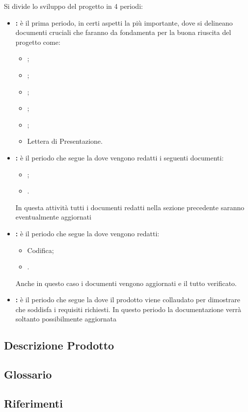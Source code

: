 \documentclass[12pt,a4paper]{article}
\begin{document}
Si divide lo sviluppo del progetto in 4 periodi:
\begin{itemize}
	\item \textbf{\FA{}:} è il prima periodo, in certi aspetti la più importante, dove si delineano documenti cruciali che faranno da fondamenta per la buona riuscita del progetto come:
	\begin{itemize}
		\item \NdP{};
		\item \SdF{};
		\item \AdR{};
		\item \PdP{};
		\item \PdQ{};
		\item Lettera di Presentazione.
	\end{itemize}
	\item \textbf{\FPA{}:} è il periodo che segue la \RR{} dove vengono redatti i seguenti documenti:
	\begin{itemize}
		\item \ST{};
        \item \DP{}.
	\end{itemize} 
	In questa attività tutti i documenti redatti nella sezione precedente saranno eventualmente aggiornati
	\item \textbf{\FPDC{}:} è il periodo che segue la \RP{} dove vengono redatti:
	\begin{itemize}
		\item Codifica;
		\item \MU{}.
	\end{itemize}
	Anche in questo caso i documenti vengono aggiornati e il tutto verificato.
	\item \textbf{\FVV{}:} è il periodo che segue la \RQ{} dove il prodotto viene collaudato per dimostrare che soddisfa i requisiti richiesti. In questo periodo la documentazione verrà soltanto possibilmente aggiornata
\end{itemize}

\subsection{Descrizione Prodotto}
\descrizioneProdotto

\subsection{Glossario}\label{glossario}
\glossarioPrint

\subsection{Riferimenti}\label{riferimenti}
\end{document}
